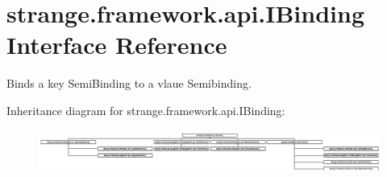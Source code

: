\hypertarget{interfacestrange_1_1framework_1_1api_1_1_i_binding}{\section{strange.\-framework.\-api.\-I\-Binding Interface Reference}
\label{interfacestrange_1_1framework_1_1api_1_1_i_binding}
}


Binds a key Semi\-Binding to a vlaue Semibinding.  


Inheritance diagram for strange.\-framework.\-api.\-I\-Binding\-:\begin{figure}[H]
\begin{center}
\leavevmode
\includegraphics[height=1.450777cm]{interfacestrange_1_1framework_1_1api_1_1_i_binding}
\end{center}
\end{figure}
